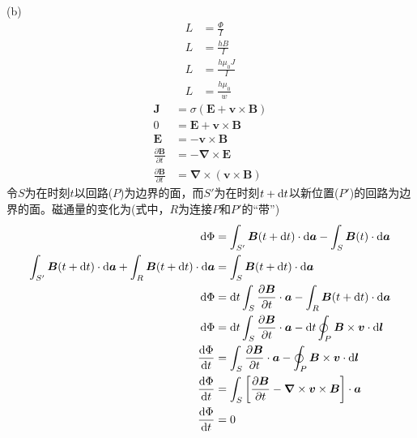 (b)\begin{align*}
    L&=\frac{\Phi}{I}\\
    L&=\frac{hB}{I}\\
    L&=\frac{h\mu_0 J}{I}\\
    L&=\frac{h\mu_0 }{w}
\end{align*}
\begin{align*}
    \boldsymbol{J}&=\sigma(\boldsymbol{E}+\boldsymbol{v}\times\boldsymbol{B})\\
    0&=\boldsymbol{E}+\boldsymbol{v}\times\boldsymbol{B}\\
    \boldsymbol{E}&=-\boldsymbol{v}\times\boldsymbol{B}\\
    \frac{\partial \boldsymbol{B}}{\partial t}&=-\boldsymbol{\nabla}\times\boldsymbol{E}\\
    \frac{\partial \boldsymbol{B}}{\partial t}&=\boldsymbol{\nabla}\times(\boldsymbol{v}\times\boldsymbol{B})
\end{align*}
令$S$为在时刻$t$以回路($P$)为边界的面，而$S'$为在时刻$t+\dif t$以新位置($P'$)的回路为边界的面。磁通量的变化为(式中，$R$为连接$P$和$P'$的“带”)
\begin{align*}
    \dif \Phi&=\int_{S'}\boldsymbol{B}(t+\dif t)\cdot\dif \boldsymbol{a}
-\int_S\boldsymbol{B}(t)\cdot\dif \boldsymbol{a}\\
\int_{S'}\boldsymbol{B}(t+\dif t)\cdot\dif \boldsymbol{a}+\int_R\boldsymbol{B}(t+\dif t)\cdot\dif \boldsymbol{a}&=\int_S\boldsymbol{B}(t+\dif t)\cdot\dif \boldsymbol{a}\\
\dif\Phi&=\dif t\int_S\dfrac{\partial \boldsymbol{B}}{\partial t}\cdot \boldsymbol{a}-\int_R\boldsymbol{B}(t+\dif t)\cdot\dif\boldsymbol{a}\\
\dif\Phi&=\dif t\int_S\dfrac{\partial \boldsymbol{B}}{\partial t}\cdot \boldsymbol{a}
-\dif t\oint_P\boldsymbol{B}\times\boldsymbol{v}\cdot\dif\boldsymbol{l}\\
\frac{\dif\Phi}{\dif t}&=\int_S\dfrac{\partial \boldsymbol{B}}{\partial t}\cdot \boldsymbol{a}
-\oint_P\boldsymbol{B}\times\boldsymbol{v}\cdot\dif\boldsymbol{l}\\
\frac{\dif\Phi}{\dif t}&=\int_S\left[\dfrac{\partial \boldsymbol{B}}{\partial t}-\boldsymbol{\nabla}\times\boldsymbol{v}\times\boldsymbol{B}\right]\cdot \boldsymbol{a}\\
\frac{\dif\Phi}{\dif t}&=0
\end{align*}
\newpage

